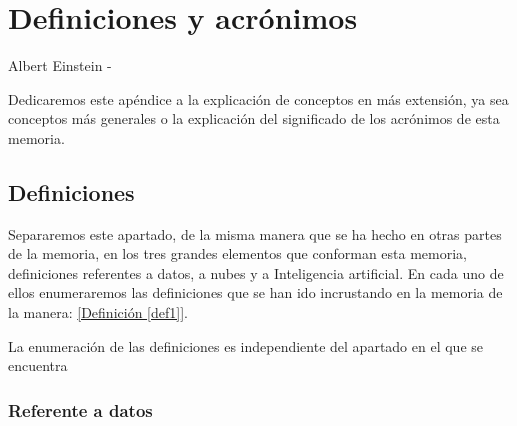 \chapter{Definiciones y acrónimos}
\label{Appendix:1}

 {Albert Einstein}
-

Dedicaremos este apéndice a la explicación de conceptos en más extensión, ya sea conceptos más generales o la explicación del significado de los acrónimos de esta memoria.

\section{Definiciones}

Separaremos este apartado, de la misma manera que se ha hecho en otras partes de la memoria, en los tres grandes elementos que conforman esta memoria, definiciones referentes a datos, a nubes y a Inteligencia artificial. En cada uno de ellos enumeraremos las definiciones que se han ido incrustando en la memoria de la manera:  \hyperref[def1]{[Definición \ref*{def1}]}.

La enumeración de las definiciones es independiente del apartado en el que se encuentra

\newpage

\subsection{Referente a datos}

